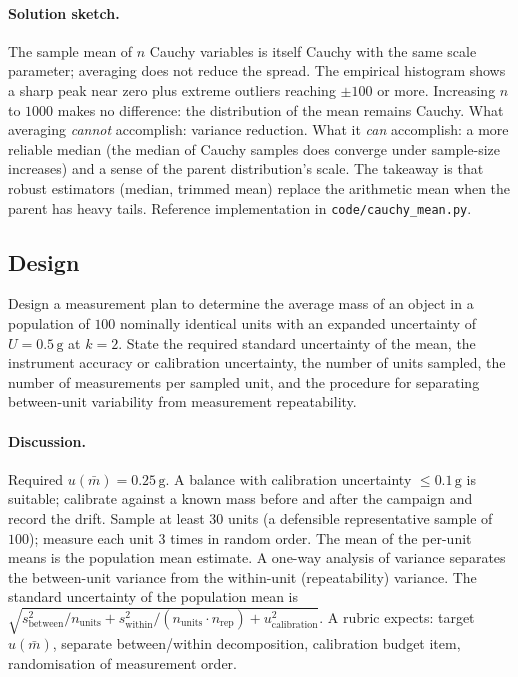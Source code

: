 \paragraph{Solution sketch.}
The sample mean of $n$ Cauchy variables is itself Cauchy with the
same scale parameter; averaging does not reduce the spread. The
empirical histogram shows a sharp peak near zero plus extreme
outliers reaching $\pm 100$ or more. Increasing $n$ to $1000$
makes no difference: the distribution of the mean remains Cauchy.
What averaging \emph{cannot} accomplish: variance reduction. What
it \emph{can} accomplish: a more reliable median (the median of
Cauchy samples does converge under sample-size increases) and a
sense of the parent distribution's scale. The takeaway is that
robust estimators (median, trimmed mean) replace the arithmetic
mean when the parent has heavy tails. Reference implementation in
\texttt{code/cauchy\_mean.py}.

\subsection*{Design}

\begin{exercise}
Design a measurement plan to determine the average mass of an
object in a population of $100$ nominally identical units with an
expanded uncertainty of $U = 0.5 \,\si{\gram}$ at $k = 2$. State
the required standard uncertainty of the mean, the instrument
accuracy or calibration uncertainty, the number of units sampled,
the number of measurements per sampled unit, and the procedure for
separating between-unit variability from measurement repeatability.
\end{exercise}

\paragraph{Discussion.}
Required $u(\bar{m}) = 0.25 \,\si{\gram}$. A balance with
calibration uncertainty $\leq 0.1 \,\si{\gram}$ is suitable;
calibrate against a known mass before and after the campaign and
record the drift. Sample at least $30$ units (a defensible
representative sample of $100$); measure each unit $3$ times in
random order. The mean of the per-unit means is the population
mean estimate. A one-way analysis of variance separates the
between-unit variance from the within-unit (repeatability)
variance. The standard uncertainty of the population mean is
$\sqrt{s_{\text{between}}^{2}/n_{\text{units}} +
s_{\text{within}}^{2}/(n_{\text{units}} \cdot n_{\text{rep}})
+ u_{\text{calibration}}^{2}}$. A rubric expects: target
$u(\bar{m})$, separate between/within decomposition, calibration
budget item, randomisation of measurement order.

